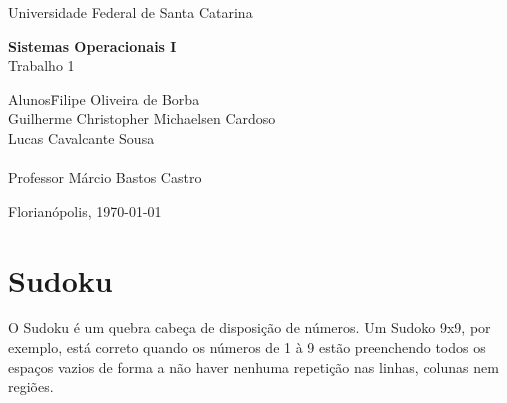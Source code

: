 \documentclass[a4paper, 12pt]{article}
\begin{document}
\begin{titlepage}
    \begin{center}
        \huge{Universidade Federal de Santa Catarina}

        \vspace{10pt}

        \vspace{85pt}

        \textbf{\LARGE{Sistemas Operacionais I}}
        \large{\\Trabalho 1}
        \vspace{160pt}

    \end{center}

    \begin{flushleft}
        \begin{tabbing}
            Alunos\qquad\qquad\=
            Filipe Oliveira de Borba\\
            \>Guilherme Christopher Michaelsen Cardoso\\
            \>Lucas Cavalcante Sousa\\\\
            Professor\> Márcio Bastos Castro \\
        \end{tabbing}
    \end{flushleft}

    \begin{center}
        \vspace{\fill}
        Florianópolis, \today
    \end{center}
\end{titlepage}


\newpage
\tableofcontents
\thispagestyle{empty}


\newpage
{}

\section{Sudoku}
O Sudoku é um quebra cabeça de disposição de números. Um Sudoko 9x9, por exemplo,
está correto quando os números de 1 à 9 estão preenchendo todos os espaços vazios
de forma a não haver nenhuma repetição nas linhas, colunas nem regiões.
\end{document}
